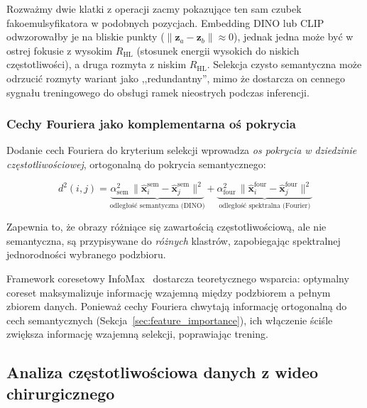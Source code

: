 Rozważmy dwie klatki z operacji zacmy pokazujące ten sam czubek
fakoemulsyfikatora w podobnych pozycjach.  Embedding DINO lub CLIP odwzorowałby
je na bliskie punkty ($\|\mathbf{z}_a - \mathbf{z}_b\| \approx 0$), jednak
jedna może być w ostrej fokusie z wysokim $R_{\text{HL}}$ (stosunek energii
wysokich do niskich częstotliwości), a druga rozmyta z niskim $R_{\text{HL}}$.
Selekcja czysto semantyczna może odrzucić rozmyty wariant jako ,,redundantny'',
mimo że dostarcza on cennego sygnału treningowego do obsługi ramek
nieostrych podczas inferencji.

\subsubsection{Cechy Fouriera jako komplementarna oś pokrycia}

Dodanie cech Fouriera do kryterium selekcji wprowadza \emph{os pokrycia
w dziedzinie częstotliwościowej}, ortogonalną do pokrycia semantycznego:

\begin{equation}
    d^2(i,j) = \underbrace{\alpha_{\text{sem}}^2\,
                \|\hat{\mathbf{x}}_i^{\text{sem}} - \hat{\mathbf{x}}_j^{\text{sem}}\|^2}
               _{\text{odległość semantyczna (DINO)}}
             + \underbrace{\alpha_{\text{four}}^2\,
                \|\hat{\mathbf{x}}_i^{\text{four}} - \hat{\mathbf{x}}_j^{\text{four}}\|^2}
               _{\text{odległość spektralna (Fourier)}}
    \label{eq:combined_distance}
\end{equation}

Zapewnia to, że obrazy różniące się zawartością częstotliwościową, ale nie
semantyczna, są przypisywane do \emph{różnych} klastrów, zapobiegając
spektralnej jednorodności wybranego podzbioru.

Framework coresetowy InfoMax~\cite{infomax2025} dostarcza teoretycznego
wsparcia: optymalny coreset maksymalizuje informację wzajemną między
podzbiorem a pełnym zbiorem danych.  Ponieważ cechy Fouriera chwytają
informację ortogonalną do cech semantycznych
(Sekcja~\ref{sec:feature_importance}), ich włączenie ściśle zwiększa
informację wzajemną selekcji, poprawiając trening.


\subsection{Analiza częstotliwościowa danych z wideo chirurgicznego}
\label{sec:surgical_fourier}

